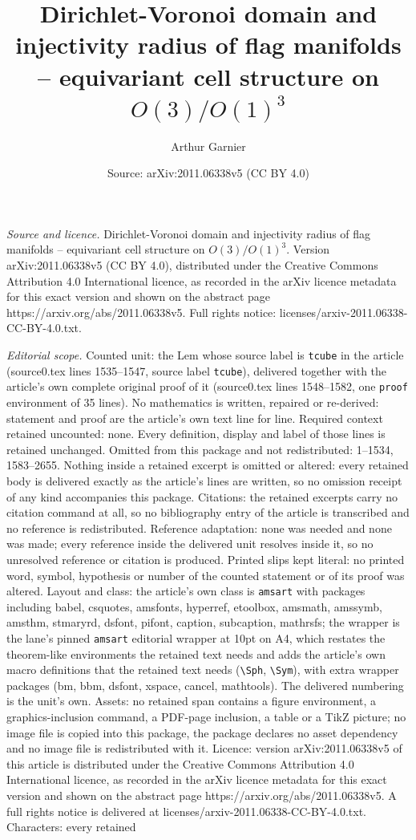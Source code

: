 \documentclass[10pt,a4paper]{amsart}
\title[Dirichlet-Voronoi domain and injectivity radius of flag mani]{Dirichlet-Voronoi domain and injectivity radius of flag manifolds -- equivariant cell structure on $O(3)/O(1)^3$}
\author{Arthur Garnier}
\date{Source: arXiv:2011.06338v5 (CC BY 4.0)}
\begin{document}
\maketitle

\noindent\emph{Source and licence.} Dirichlet-Voronoi domain and injectivity radius of flag manifolds -- equivariant cell structure on $O(3)/O(1)^3$. Version arXiv:2011.06338v5 (CC BY 4.0), distributed under the Creative Commons Attribution 4.0 International licence, as recorded in the arXiv licence metadata for this exact version and shown on the abstract page https://arxiv.org/abs/2011.06338v5. Full rights notice: licenses/arxiv-2011.06338-CC-BY-4.0.txt.\par\smallskip

\noindent\textit{Editorial scope.} Counted unit: the Lem whose source label is \texttt{tcube} in the article (source0.tex lines 1535--1547, source label \texttt{tcube}), delivered together with the article's own complete original proof of it (source0.tex lines 1548--1582, one \texttt{proof} environment of 35 lines). No mathematics is written, repaired or re-derived: statement and proof are the article's own text line for line. Required context retained uncounted: none. Every definition, display and label of those lines is retained unchanged. Omitted from this package and not redistributed: 1--1534, 1583--2655. Nothing inside a retained excerpt is omitted or altered: every retained body is delivered exactly as the article's lines are written, so no omission receipt of any kind accompanies this package. Citations: the retained excerpts carry no citation command at all, so no bibliography entry of the article is transcribed and no reference is redistributed. Reference adaptation: none was needed and none was made; every reference inside the delivered unit resolves inside it, so no unresolved reference or citation is produced. Printed slips kept literal: no printed word, symbol, hypothesis or number of the counted statement or of its proof was altered. Layout and class: the article's own class is \texttt{amsart} with packages including babel, csquotes, amsfonts, hyperref, etoolbox, amsmath, amssymb, amsthm, stmaryrd, dsfont, pifont, caption, subcaption, mathrsfs; the wrapper is the lane's pinned \texttt{amsart} editorial wrapper at 10pt on A4, which restates the theorem-like environments the retained text needs and adds the article's own macro definitions that the retained text needs (\texttt{\textbackslash Sph}, \texttt{\textbackslash Sym}), with extra wrapper packages (bm, bbm, dsfont, xspace, cancel, mathtools). The delivered numbering is the unit's own. Assets: no retained span contains a figure environment, a graphics-inclusion command, a PDF-page inclusion, a table or a TikZ picture; no image file is copied into this package, the package declares no asset dependency and no image file is redistributed with it. Licence: version arXiv:2011.06338v5 of this article is distributed under the Creative Commons Attribution 4.0 International licence, as recorded in the arXiv licence metadata for this exact version and shown on the abstract page https://arxiv.org/abs/2011.06338v5. A full rights notice is delivered at licenses/arxiv-2011.06338-CC-BY-4.0.txt. Characters: every retained 
\end{document}
